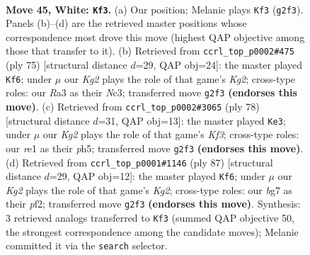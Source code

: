 \documentclass[11pt]{article}
\begin{document}
\clearpage

\begin{figure}[p]\centering
\begin{subfigure}{0.46\textwidth}\centering
\resizebox{\linewidth}{!}{%
\newchessgame
\chessboard[
  setfen={2N5/1p4bk/6p1/5p1p/Pr6/R5PP/5PK1/4r3 w - - 5 45},
  showmover=false,
  pgfstyle=straightmove, color=movearrow, markmove={g2-f3}
]}
\caption{}
\end{subfigure}\hfill
\begin{subfigure}{0.46\textwidth}\centering
\resizebox{\linewidth}{!}{%
\newchessgame
\chessboard[
  setfen={8/5pkp/8/r2p2p1/3R2P1/2n1P2P/1N3PK1/8 b - - 5 38},
  showmover=false,
  pgfstyle=straightmove, color=movearrow, markmove={g7-f6}
]}
\caption{}
\end{subfigure}
\\[4pt]
\begin{subfigure}{0.46\textwidth}\centering
\resizebox{\linewidth}{!}{%
\newchessgame
\chessboard[
  setfen={8/4kp2/6p1/pr4Pp/4PP2/1P1R1K2/7P/8 w - - 0 40},
  showmover=false,
  pgfstyle=straightmove, color=movearrow, markmove={f3-e3}
]}
\caption{}
\end{subfigure}\hfill
\begin{subfigure}{0.46\textwidth}\centering
\resizebox{\linewidth}{!}{%
\newchessgame
\chessboard[
  setfen={8/5pk1/6pp/p3R3/6PP/r3P3/5PK1/8 b - - 0 44},
  showmover=false,
  pgfstyle=straightmove, color=movearrow, markmove={g7-f6}
]}
\caption{}
\end{subfigure}
\caption{\textbf{Move 45, White: \texttt{Kf3}.} (a) Our position; Melanie plays \texttt{Kf3} (\texttt{g2f3}). Panels (b)--(d) are the retrieved master positions whose correspondence most drove this move (highest QAP objective among those that transfer to it). (b) Retrieved from \texttt{ccrl\_top\_p0002\#475} (ply 75) [structural distance $d$=29, QAP obj=24]: the master played \texttt{Kf6}; under $\mu$ our \emph{Kg2} plays the role of that game's \emph{Kg2}; cross-type roles: our \emph{R}a3 as their \emph{N}c3; transferred move \texttt{g2f3} \textbf{(endorses this move)}. (c) Retrieved from \texttt{ccrl\_top\_p0002\#3065} (ply 78) [structural distance $d$=31, QAP obj=13]: the master played \texttt{Ke3}; under $\mu$ our \emph{Kg2} plays the role of that game's \emph{Kf3}; cross-type roles: our \emph{r}e1 as their \emph{p}h5; transferred move \texttt{g2f3} \textbf{(endorses this move)}. (d) Retrieved from \texttt{ccrl\_top\_p0001\#1146} (ply 87) [structural distance $d$=29, QAP obj=12]: the master played \texttt{Kf6}; under $\mu$ our \emph{Kg2} plays the role of that game's \emph{Kg2}; cross-type roles: our \emph{b}g7 as their \emph{p}f2; transferred move \texttt{g2f3} \textbf{(endorses this move)}. Synthesis: 3 retrieved analogs transferred to \texttt{Kf3} (summed QAP objective 50, the strongest correspondence among the candidate moves); Melanie committed it via the \texttt{search} selector.}
\label{fig:thought-m88}
\end{figure}
\end{document}

